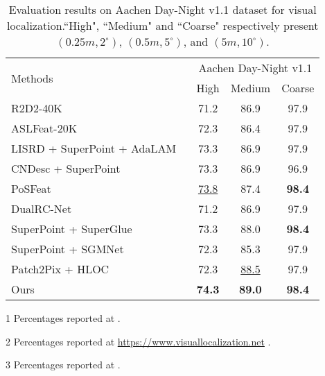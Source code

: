 \documentclass[journal]{IEEEtran}
\begin{document}
\begin{table}[h]
\centering
\renewcommand\arraystretch{1.5}
\caption{Evaluation results on Aachen Day-Night v1.1 dataset for visual localization.``High", ``Medium" and ``Coarse" respectively present $(0.25m, 2^{\circ})$, $(0.5m, 5^{\circ})$, and $(5m, 10^{\circ})$.}
\resizebox{.99\columnwidth}{!}
{
\begin{threeparttable}
\begin{tabular}{l|ccc}
    \hline
    \multirow{2}{*}{Methods} & \multicolumn{3}{c}{Aachen Day-Night v1.1} \\
    \cline{2-4}
            & High & Medium & Coarse \\
    \hline
    \hline
    R2D2-40K\tnote{1} \ \cite{R2D2}       & 71.2 & 86.9 & 97.9  \\
    ASLFeat-20K\tnote{2} \ \cite{aslfeat}    & 72.3 & 86.4 & 97.9 \\
    LISRD + SuperPoint + AdaLAM\tnote{1} \ \cite{LISRD} & 73.3 & 86.9 & 97.9 \\
    CNDesc + SuperPoint\tnote{3} \ \cite{cndesc} & 73.3 & 86.9 & 96.9 \\
    PoSFeat\tnote{1} \ \cite{li2022decoupling}            & \underline{73.8} & 87.4 & \textbf{98.4} \\
    
    \hline
    \hline
    DualRC-Net\tnote{1} \ \cite{DualRC-Net}             & 71.2 & 86.9 & 97.9 \\
    SuperPoint + SuperGlue\tnote{1} \ \cite{SuperGlue} & 73.3 & 88.0 & \textbf{98.4} \\
    SuperPoint + SGMNet\tnote{1} \ \cite{sgmnet}    & 72.3 & 85.3 & 97.9 \\
    Patch2Pix \cite{Patch2Pix} + HLOC\tnote{2} \ \cite{HLOC}                    & 72.3 & \underline{88.5} & 97.9 \\
    \hline
    \hline
    Ours  & \textbf{74.3} & \textbf{89.0} & \textbf{98.4} \\
    \hline
\end{tabular}
\begin{tablenotes}
\footnotesize
\item[1] Percentages reported at \cite{li2022decoupling}.
\item[2] Percentages reported at \href{https://www.visuallocalization.net/benchmark/}{https://www.visuallocalization.net} \cite{aachen}.
\item[3] Percentages reported at \cite{cndesc}.
\end{tablenotes}
\end{threeparttable}
}
\label{table2}
\end{table}
\end{document}
